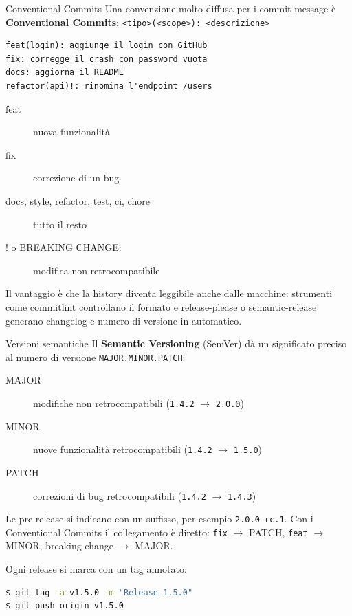 \documentclass[aspectratio=169,handout,10pt]{beamer}
\begin{document}
\begin{frame}[fragile]{Conventional Commits}
    Una convenzione molto diffusa per i commit message è \textbf{Conventional Commits}: \lstinline{<tipo>(<scope>): <descrizione>}
    \begin{lstlisting}
feat(login): aggiunge il login con GitHub
fix: corregge il crash con password vuota
docs: aggiorna il README
refactor(api)!: rinomina l'endpoint /users\end{lstlisting}
    \begin{description}
        \item[feat] nuova funzionalità
        \item[fix] correzione di un bug
        \item[docs, style, refactor, test, ci, chore] tutto il resto
        \item[! o BREAKING CHANGE:] modifica non retrocompatibile
    \end{description}
    Il vantaggio è che la history diventa leggibile anche dalle macchine: strumenti come commitlint controllano il formato e release-please o semantic-release generano changelog e numero di versione in automatico.
\end{frame}
\begin{frame}[fragile]{Versioni semantiche}
    Il \textbf{Semantic Versioning} (SemVer) dà un significato preciso al numero di versione \texttt{MAJOR.MINOR.PATCH}:
    \begin{description}
        \item[MAJOR] modifiche non retrocompatibili (\texttt{1.4.2} \(\rightarrow\) \texttt{2.0.0})
        \item[MINOR] nuove funzionalità retrocompatibili (\texttt{1.4.2} \(\rightarrow\) \texttt{1.5.0})
        \item[PATCH] correzioni di bug retrocompatibili (\texttt{1.4.2} \(\rightarrow\) \texttt{1.4.3})
    \end{description}
    Le pre-release si indicano con un suffisso, per esempio \texttt{2.0.0-rc.1}. Con i Conventional Commits il collegamento è diretto: \texttt{fix} \(\rightarrow\) PATCH, \texttt{feat} \(\rightarrow\) MINOR, breaking change \(\rightarrow\) MAJOR.

    Ogni release si marca con un tag annotato:
    \begin{lstlisting}[language=bash]
$ git tag -a v1.5.0 -m "Release 1.5.0"
$ git push origin v1.5.0\end{lstlisting}
\end{frame}
\end{document}
